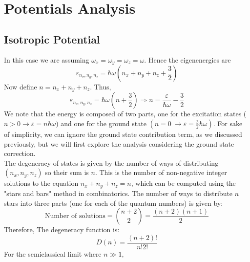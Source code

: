 \documentclass{article}
\numberwithin{equation}{section}
\numberwithin{equation}{subsection}
\begin{document}
\section{Potentials Analysis}

\subsection{Isotropic Potential}
In this case we are assuming $\omega_{\mathit{x}} = \omega_{\mathit{y}} = \omega_{\mathit{z}} = \omega$. Hence the eigenenergies are
\begin{equation}
    \varepsilon_{\mathit{n}_{\mathit{x}},\mathit{n}_{\mathit{y}},\mathit{n}_{\mathit{z}}} = \hbar\omega\left(\mathit{n}_{\mathit{x}}+\mathit{n}_{\mathit{y}}+\mathit{n}_{\mathit{z}}+\frac{3}{2}\right)
\end{equation}
Now define $ \mathit{n} = \mathit{n}_{\mathit{x}}+\mathit{n}_{\mathit{y}}+\mathit{n}_{\mathit{z}}$. Thus,
\begin{equation}
\varepsilon_{\mathit{n}_{\mathit{x}},\mathit{n}_{\mathit{y}},\mathit{n}_{\mathit{z}}} = \hbar\omega\left(\mathit{n}+\frac{3}{2}\right) \Longrightarrow \mathit{n} = \frac{\varepsilon}{\hbar\omega}-\frac{3}{2}
\end{equation}
We note that the energy is composed of two parts, one for the excitation states ($\mathit{n} > 0 \rightarrow \varepsilon = \mathit{n}\hbar\omega$) and one for the ground state $\left(\mathit{n} = 0 \ \rightarrow \varepsilon = \frac{3}{2}\hbar\omega\right)$. For sake of simplicity, we can ignore the ground state contribution term, as we discussed previously, but we will first explore the analysis considering the ground state correction.\\
The degeneracy of states is given by the number of ways of distributing $(\mathit{n}_{\mathit{x}}, \mathit{n}_{\mathit{y}}, \mathit{n}_{\mathit{z}})$ so their sum is $\mathit{n}$. 
This is the number of non-negative integer solutions to the equation $\mathit{n}_{\mathit{x}} + \mathit{n}_{\mathit{y}} + \mathit{n}_{\mathit{z}} = n$, which can be computed using the "stars and bars" method in combinatorics. The number of ways to distribute $n$ stars into three parts (one for each of the quantum numbers) is given by:
\[
\text{Number of solutions} = \binom{n+2}{2} = \frac{(n+2)(n+1)}{2}
\]
Therefore, The degeneracy function is:
\begin{equation}
    D(\mathit{n}) = \frac{(\mathit{n}+2)!}{\mathit{n}!2!}
\end{equation}
For the semiclassical limit where \( \mathit{n} \gg 1 \),
\end{document}

